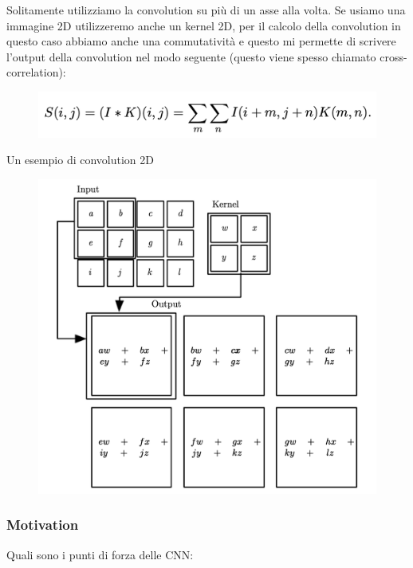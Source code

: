 \documentclass[14pt]{extreport}
\begin{document}
Solitamente utilizziamo la convolution su più di un asse alla volta.
Se usiamo una immagine 2D utilizzeremo anche un kernel 2D, per il calcolo della convolution in questo caso 
abbiamo anche una commutatività e questo mi permette di scrivere l'output della convolution nel modo seguente (questo
viene spesso chiamato cross-correlation):

\begin{figure}[H]
	\centering
	\includegraphics[width=0.7\linewidth]{410.jpeg}
	\end{figure}

Un esempio di convolution 2D
\begin{figure}[H]
	\centering
	\includegraphics[width=0.7\linewidth]{409.jpeg}
	\end{figure}

\subsubsection{Motivation}

Quali sono i punti di forza delle CNN:
\end{document}
